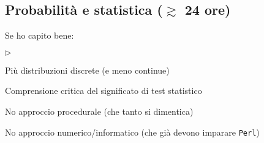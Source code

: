 \documentclass[10pt]{article}
\newcommand{\mylabel}[1]{#1\hfill}
\newenvironment{sitemize}
  {\begin{list}{$\triangleright$}{%
   \setlength{\parskip}{0mm}
   \setlength{\topsep}{2mm}
   \setlength{\rightmargin}{0mm}
   \setlength{\listparindent}{0mm}
   \setlength{\itemindent}{0mm}
   \setlength{\labelwidth}{2ex}
   \setlength{\itemsep}{.4\baselineskip}
   \setlength{\parsep}{0mm}
   \setlength{\partopsep}{0mm}
   \setlength{\labelsep}{1ex}
   \setlength{\leftmargin}{\labelwidth+\labelsep}
   \let\makelabel\mylabel}}{%
   \end{list}}
\begin{document}
\clearpage
\subsection{Probabilità e statistica (\boldmath$\gtrsim$ 24 ore) }
\colorbox{blue!10}{\begin{minipage}{\textwidth}
Se ho capito bene: 
\begin{sitemize}
\item Più distribuzioni discrete (e meno continue)
\item Comprensione critica del significato di test statistico
\item No approccio procedurale (che tanto si dimentica)
\item No approccio numerico/informatico (che già devono imparare {\tt Perl})
\end{sitemize}
\end{minipage}}
\end{document}
